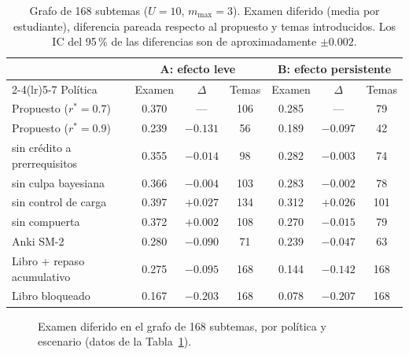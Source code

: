 \documentclass[12pt]{article}
\theoremstyle{definition}
\newcommand{\rstar}{r^{\ast}}
\begin{document}
\begin{table}[H]
\centering\small
\caption{Grafo de 168 subtemas ($U=10$, $m_{\max}=3$). Examen diferido (media por estudiante), diferencia pareada respecto al propuesto y temas introducidos. Los IC del 95\,\% de las diferencias son de aproximadamente $\pm0.002$.}
\label{tab:subtemas}
\setlength{\tabcolsep}{3.5pt}
\begin{tabular}{@{}lcccccc@{}}
\toprule
& \multicolumn{3}{c}{A: efecto leve} & \multicolumn{3}{c}{B: efecto persistente} \\
\cmidrule(lr){2-4}\cmidrule(lr){5-7}
Política & Examen & $\Delta$ & Temas & Examen & $\Delta$ & Temas \\
\midrule
Propuesto ($\rstar=0.7$) & 0.370 & --- & 106 & 0.285 & --- & 79 \\
Propuesto ($\rstar=0.9$) & 0.239 & $-0.131$ & 56 & 0.189 & $-0.097$ & 42 \\
\quad sin crédito a prerrequisitos & 0.355 & $-0.014$ & 98 & 0.282 & $-0.003$ & 74 \\
\quad sin culpa bayesiana & 0.366 & $-0.004$ & 103 & 0.283 & $-0.002$ & 78 \\
\quad sin control de carga & 0.397 & $+0.027$ & 134 & 0.312 & $+0.026$ & 101 \\
\quad sin compuerta & 0.372 & $+0.002$ & 108 & 0.270 & $-0.015$ & 79 \\
Anki SM-2 & 0.280 & $-0.090$ & 71 & 0.239 & $-0.047$ & 63 \\
Libro + repaso acumulativo & 0.275 & $-0.095$ & 168 & 0.144 & $-0.142$ & 168 \\
Libro bloqueado & 0.167 & $-0.203$ & 168 & 0.078 & $-0.207$ & 168 \\
\bottomrule
\end{tabular}
\end{table}

\begin{figure}[H]
\centering
{}
\caption{Examen diferido en el grafo de 168 subtemas, por política y escenario (datos de la Tabla~\ref{tab:subtemas}).}
\label{fig:barras}
\end{figure}
\end{document}
